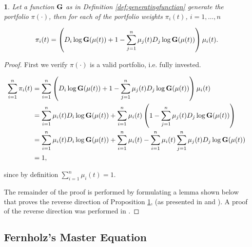 \documentclass[british]{amsart} \usepackage{lmodern}
\numberwithin{equation}{section} \numberwithin{figure}{section}
\theoremstyle{plain} \newtheorem{thm}{\protect\theoremname}[section]
\theoremstyle{definition} \newtheorem{defn}[thm]{\protect\definitionname}
\theoremstyle{plain} \newtheorem{assumption}[thm]{\protect\assumptionname}
\theoremstyle{plain} \newtheorem{lem}[thm]{\protect\lemmaname}
\theoremstyle{plain} \newtheorem{prop}[thm]{\protect\propositionname}
\theoremstyle{remark} \newtheorem{rem}[thm]{\protect\remarkname}
\theoremstyle{plain} \newtheorem{cor}[thm]{\protect\corollaryname}
\newcommand{\rangei}{i=1,\dots,n} \newcommand{\measure}{\mathbb{P}}
\begin{document}
\begin{prop} 
  \label{prop:generatingfunction}
  Let a function $\mathbf{G}$ as in Definition \ref{def:generatingfunction}
  generate the portfolio $\pi(\cdot)$, then for each of the portfolio weights
  $\pi_{i}(t)$, $\rangei$

  \begin{equation}
    \pi_{i}(t) = 
      \left( 
        D_{i}\log{\mathbf{G}}(\mu(t)) + 1 - 
          \sum_{j=1}^{n} \mu_{j}(t)D_{j}\log{\mathbf{G}(\mu(t))}
      \right) \mu_{i}(t).
  \end{equation}

\end{prop}

\begin{proof}
  First we verify $\pi(\cdot)$ is a valid portfolio, i.e. fully invested.

   \begin{gather}
    \begin{split}
      \sum_{i=1}^{n} \pi_{i}(t) 
      &= \sum_{i=1}^{n} 
        \left( 
          D_{i}\log{\mathbf{G}}(\mu(t)) + 1 - 
            \sum_{j=1}^{n} \mu_{j}(t)D_{j}\log{\mathbf{G}(\mu(t))}
        \right) \mu_{i}(t) \\
      &= 
        \sum_{i=1}^{n} \mu_{i}(t) D_{i}\log{\mathbf{G}}(\mu(t)) + 
        \sum_{i=1}^{n} \mu_{i}(t)
        \left( 
          1 - \sum_{j=1}^{n} \mu_{j}(t)D_{j}\log{\mathbf{G}(\mu(t))}
        \right) \\
       &= 
        \sum_{i=1}^{n} \mu_{i}(t) D_{i}\log{\mathbf{G}}(\mu(t)) + 
        \sum_{i=1}^{n} \mu_{i}(t) -
        \sum_{i=1}^{n} \mu_{i}(t) \sum_{j=1}^{n} \mu_{j}(t)D_{j}\log{\mathbf{G}(\mu(t))}
\\
       &= 1,
  \end{split}
  \end{gather}

  since by definition $\sum_{i=1}^{n} \mu_{i}(t) = 1$.

  The remainder of the proof is performed by formulating a lemma shown below that
  proves the reverse direction of Proposition \ref{prop:generatingfunction}, (as
  presented in \cite{fernholz2009} and \cite{vervuurt2015}). A proof of the
  reverse direction was performed in \cite{fernholz1999pgf}. 

\end{proof}

\subsection{Fernholz's Master Equation}
\end{document}
